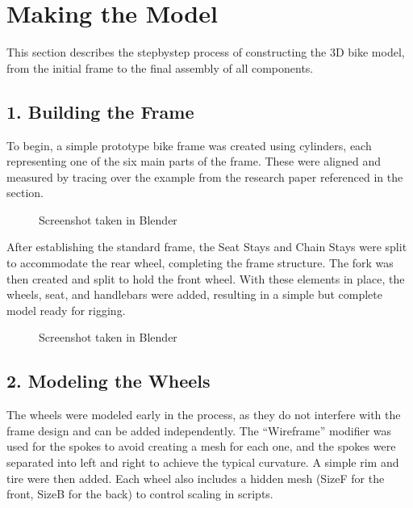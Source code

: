 \documentclass[letterpaper,10pt,english]{jupyterBook}
\begin{document}
\sphinxstepscope


\section{Making the Model}
\label{\detokenize{Making the Model:making-the-model}}\label{\detokenize{Making the Model::doc}}
\sphinxAtStartPar
This section describes the step\sphinxhyphen{}by\sphinxhyphen{}step process of constructing the 3D bike model, from the initial frame to the final assembly of all components.


\subsection{1. Building the Frame}
\label{\detokenize{Making the Model:building-the-frame}}
\sphinxAtStartPar
To begin, a simple prototype bike frame was created using cylinders, each representing one of the six main parts of the frame. These were aligned and measured by tracing over the example from the research paper referenced in the {\hyperref[\detokenize{Research::doc}]{}} section.

\begin{figure}[htbp]
\centering
\capstart

\noindent{}
\caption{Screenshot taken in Blender}\label{\detokenize{Making the Model:modeling}}\end{figure}

\sphinxAtStartPar
After establishing the standard frame, the Seat Stays and Chain Stays were split to accommodate the rear wheel, completing the frame structure. The fork was then created and split to hold the front wheel. With these elements in place, the wheels, seat, and handlebars were added, resulting in a simple but complete model ready for rigging.

\begin{figure}[htbp]
\centering
\capstart

\noindent{}
\caption{Screenshot taken in Blender}\label{\detokenize{Making the Model:modeling-final}}\end{figure}


\subsection{2. Modeling the Wheels}
\label{\detokenize{Making the Model:modeling-the-wheels}}
\sphinxAtStartPar
The wheels were modeled early in the process, as they do not interfere with the frame design and can be added independently. The “Wireframe” modifier was used for the spokes to avoid creating a mesh for each one, and the spokes were separated into left and right to achieve the typical curvature. A simple rim and tire were then added. Each wheel also includes a hidden mesh (SizeF for the front, SizeB for the back) to control scaling in scripts.
\end{document}
